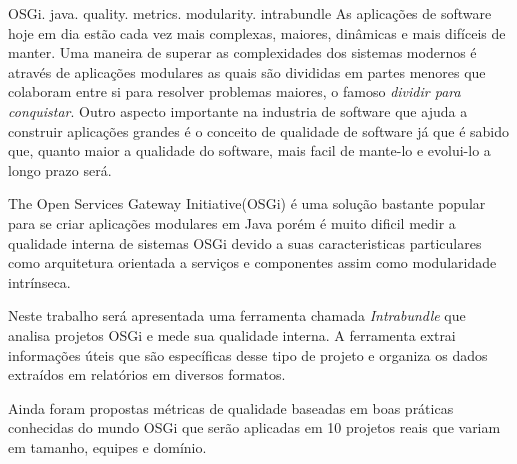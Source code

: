 \begin{englishabstract}{}{OSGi. java. quality. metrics. modularity. intrabundle}
As aplicações de software hoje em dia estão cada vez mais complexas, maiores, dinâmicas e mais difíceis de manter. Uma maneira de superar as complexidades dos sistemas modernos é através de aplicações modulares as quais são divididas em partes menores que colaboram entre si para resolver problemas maiores, o famoso \emph{dividir para conquistar}. Outro aspecto importante na industria de software que ajuda a construir aplicações grandes é o conceito de qualidade de software já que é sabido que, quanto maior a qualidade do software, mais facil de mante-lo e evolui-lo a longo prazo será.

The Open Services Gateway Initiative(OSGi) é uma solução bastante popular para se criar aplicações modulares em Java porém é muito dificil medir a qualidade interna de sistemas OSGi devido a suas caracteristicas particulares como arquitetura orientada a serviços e componentes assim como modularidade intrínseca. 

Neste trabalho será apresentada uma ferramenta chamada \emph{Intrabundle} que analisa projetos OSGi e mede sua qualidade interna. A ferramenta extrai informações úteis que são específicas desse tipo de projeto e organiza os dados extraídos em relatórios em diversos formatos.

Ainda foram propostas métricas de qualidade baseadas em boas práticas conhecidas do mundo OSGi que serão aplicadas em 10 projetos reais que variam em tamanho, equipes e domínio.
\end{englishabstract}
